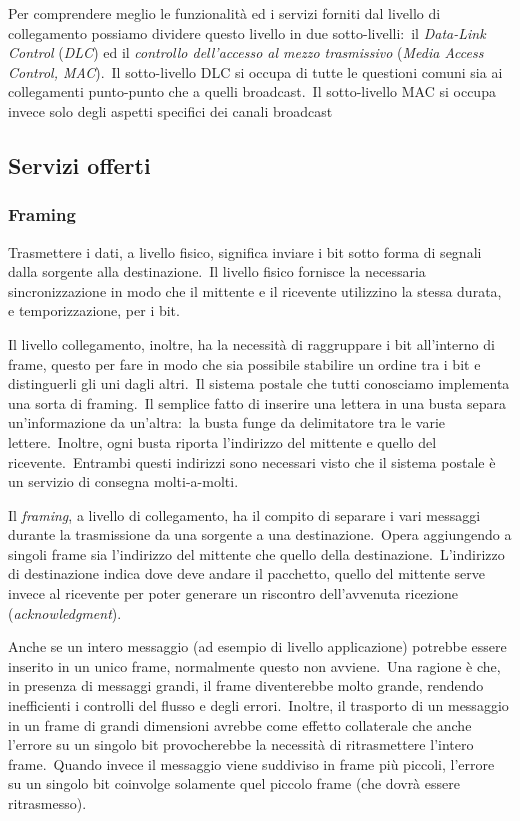 Per comprendere meglio le funzionalità ed i servizi forniti dal livello di collegamento possiamo dividere questo livello in due sotto-livelli:\ il \emph{Data-Link Control} (\emph{DLC}) ed il \emph{controllo dell'accesso al mezzo trasmissivo} (\emph{Media Access Control, MAC}).\
Il sotto-livello DLC si occupa di tutte le questioni comuni sia ai collegamenti punto-punto che a quelli broadcast.\
Il sotto-livello MAC si occupa invece solo degli aspetti specifici dei canali broadcast

\subsection{Servizi offerti}

\subsubsection{Framing}

Trasmettere i dati, a livello fisico, significa inviare i bit sotto forma di segnali dalla sorgente alla destinazione.\
Il livello fisico fornisce la necessaria sincronizzazione in modo che il mittente e il ricevente utilizzino la stessa durata, e temporizzazione, per i bit.

Il livello collegamento, inoltre, ha la necessità di raggruppare i bit all'interno di frame, questo per fare in modo che sia possibile stabilire un ordine tra i bit e distinguerli gli uni dagli altri.\
Il sistema postale che tutti conosciamo implementa una sorta di framing.\
Il semplice fatto di inserire una lettera in una busta separa un'informazione da un'altra:\ la busta funge da delimitatore tra le varie lettere.\
Inoltre, ogni busta riporta l'indirizzo del mittente e quello del ricevente.\
Entrambi questi indirizzi sono necessari visto che il sistema postale è un servizio di consegna molti-a-molti.

Il \emph{framing}, a livello di collegamento, ha il compito di separare i vari messaggi durante la trasmissione da una sorgente a una destinazione.\
Opera aggiungendo a singoli frame sia l'indirizzo del mittente che quello della destinazione.\
L'indirizzo di destinazione indica dove deve andare il pacchetto, quello del mittente serve invece al ricevente per poter generare un riscontro dell'avvenuta ricezione (\emph{acknowledgment}).

Anche se un intero messaggio (ad esempio di livello applicazione) potrebbe essere inserito in un unico frame, normalmente questo non avviene.\
Una ragione è che, in presenza di messaggi grandi, il frame diventerebbe molto grande, rendendo inefficienti i controlli del flusso e degli errori.\
Inoltre, il trasporto di un messaggio in un frame di grandi dimensioni avrebbe come effetto collaterale che anche l'errore su un singolo bit provocherebbe la necessità di ritrasmettere l'intero frame.\
Quando invece il messaggio viene suddiviso in frame più piccoli, l'errore su un singolo bit coinvolge solamente quel piccolo frame (che dovrà essere ritrasmesso).

